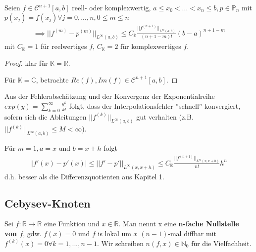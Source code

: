 \begin{corollary}
	Seien $f \in \mathcal{C}^{n+1}[a,b]$ reell- oder komplexwertig, $a \leq x_0 < ... < x_n \leq b, p \in \mathbb{P}_n$ mit $p(x_j)=f(x_j) \forall j=0, ..., n, 0 \leq m \leq n$
	\begin{align*}
		\implies ||f^{(m)}-p^{(m)}||_{L^\infty(a,b)} \leq C_\mathbb{K} \frac{||f^{(n+1)}||_{L^\infty(a,b)}}{(n+1-m)!} (b-a)^{n+1-m}
	\end{align*}
	mit $C_{\mathbb{K}}=1$ für reelwertiges $f$, $C_{\mathbb{K}} = 2$ für komplexwertiges $f$.
\end{corollary}

\begin{proof}
	klar für $\mathbb{K} = \mathbb{R}$.
	
	Für $\mathbb{K} = \mathbb{C}$, betrachte $Re(f), Im(f) \in \mathcal{C}^{n+1}[a,b]$.
\end{proof}

\begin{remark}
	Aus der Fehlerabschätzung und der Konvergenz der Exponentialreihe $exp(y) = \sum_{k=0}^{\infty}\frac{y^k}{k!}$ folgt, dass der Interpolationsfehler ''schnell'' konvergiert, sofern sich die Ableitungen $||f^{(k)}||_{L^\infty(a,b)}$ gut verhalten (z.B. $||f^{(k)}||_{L^\infty(a,b)} \leq M < \infty$).
\end{remark}

\begin{remark}
	Für $m=1, a = x$ und $b = x+h$ folgt
	\begin{align*}
		|f'(x)-p'(x)| \leq ||f'-p'||_{L^\infty(x,x+h)} \leq C_{\mathbb{K}} \frac{||f^{(n+1)}||_{L^\infty(x,x+h)}}{n!} h^n
	\end{align*}
	d.h. besser als die Differenzquotienten aus Kapitel 1.
\end{remark}

\subsection{Cebysev-Knoten}

\begin{definition}
	Sei $f:\mathbb{R} \rightarrow \mathbb{R}$ eine Funktion und $x \in \mathbb{R}$. Man nennt x eine \textbf{n-fache Nullstelle von $f$}, gdw. $f(x)=0$ und $f$ is lokal um $x$ $(n-1)$-mal diffbar mit $f^{(k)}(x)=0 \forall k=1, ..., n-1$. Wir schreiben $n(f,x) \in \mathbb{N}_0$ für die Vielfachheit.
\end{definition}

